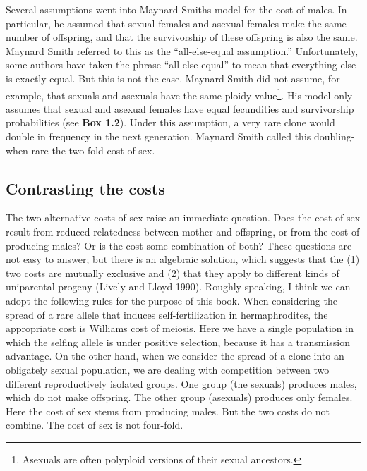 \documentclass[
  letterpaper,
]{scrbook}
\begin{document}
Several assumptions went into Maynard Smith\textquotesingle s model for
the cost of males. In particular, he assumed that sexual females and
asexual females make the same number of offspring, and that the
survivorship of these offspring is also the same. Maynard Smith referred
to this as the ``all-else-equal assumption.'' Unfortunately, some
authors have taken the phrase ``all-else-equal'' to mean that everything
else is exactly equal. But this is not the case. Maynard Smith did not
assume, for example, that sexuals and asexuals have the same ploidy
value\footnote{Asexuals are often polyploid versions of their sexual
  ancestors.}. His model only assumes that sexual and asexual females
have equal fecundities and survivorship probabilities (see \textbf{Box
1.2}). Under this assumption, a very rare clone would double in
frequency in the next generation. Maynard Smith called this
doubling-when-rare the two-fold cost of sex.

\hypertarget{contrasting-the-costs}{%
\subsection{Contrasting the costs}\label{contrasting-the-costs}}

The two alternative costs of sex raise an immediate question. Does the
cost of sex result from reduced relatedness between mother and
offspring, or from the cost of producing males? Or is the cost some
combination of both? These questions are not easy to answer; but there
is an algebraic solution, which suggests that the (1) two costs are
mutually exclusive and (2) that they apply to different kinds of
uniparental progeny (Lively and Lloyd 1990). Roughly speaking, I think
we can adopt the following rules for the purpose of this book. When
considering the spread of a rare allele that induces self-fertilization
in hermaphrodites, the appropriate cost is Williams\textquotesingle{}
cost of meiosis. Here we have a single population in which the selfing
allele is under positive selection, because it has a transmission
advantage. On the other hand, when we consider the spread of a clone
into an obligately sexual population, we are dealing with competition
between two different reproductively isolated groups. One group (the
sexuals) produces males, which do not make offspring. The other group
(asexuals) produces only females. Here the cost of sex stems from
producing males. But the two costs do not combine. The cost of sex is
not four-fold.
\end{document}

